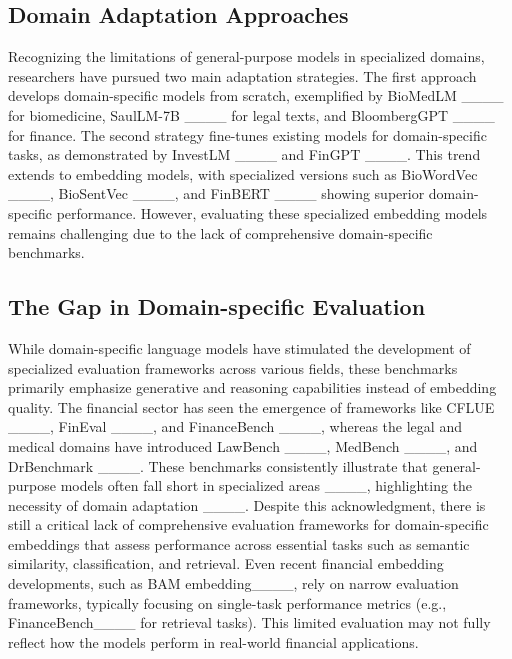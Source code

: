 \subsection{Domain Adaptation Approaches}
Recognizing the limitations of general-purpose models in specialized domains, researchers have pursued two main adaptation strategies. The first approach develops domain-specific models from scratch, exemplified by BioMedLM ____ for biomedicine, SaulLM-7B ____ for legal texts, and BloombergGPT ____ for finance. The second strategy fine-tunes existing models for domain-specific tasks, as demonstrated by InvestLM ____ and FinGPT ____. This trend extends to embedding models, with specialized versions such as BioWordVec ____, BioSentVec ____, and FinBERT ____ showing superior domain-specific performance. However, evaluating these specialized embedding models remains challenging due to the lack of comprehensive domain-specific benchmarks.


\subsection{The Gap in Domain-specific Evaluation}
While domain-specific language models have stimulated the development of specialized evaluation frameworks across various fields, these benchmarks primarily emphasize generative and reasoning capabilities instead of embedding quality. The financial sector has seen the emergence of frameworks like CFLUE ____, FinEval ____, and FinanceBench ____, whereas the legal and medical domains have introduced LawBench ____, MedBench ____, and DrBenchmark ____. These benchmarks consistently illustrate that general-purpose models often fall short in specialized areas ____, highlighting the necessity of domain adaptation ____. Despite this acknowledgment, there is still a critical lack of comprehensive evaluation frameworks for domain-specific embeddings that assess performance across essential tasks such as semantic similarity, classification, and retrieval. Even recent financial embedding developments, such as BAM embedding____, rely on narrow evaluation frameworks, typically focusing on single-task performance metrics (e.g., FinanceBench____ for retrieval tasks). 
This limited evaluation may not fully reflect how the models perform in real-world financial applications.





